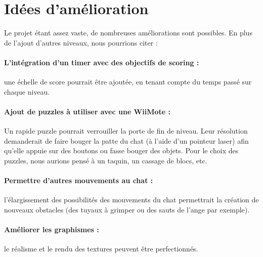 \documentclass[a4paper,11pt]{article}
\begin{document}
\section{Idées d'amélioration}
Le projet étant assez vaste, de nombreuses améliorations sont possibles. En plus de l'ajout d'autres niveaux, nous pourrions citer : 
\paragraph{L'intégration d'un timer avec des objectifs de scoring :} une échelle de score pourrait être ajoutée, en tenant compte du temps passé sur chaque niveau.
\paragraph{Ajout de puzzles à utiliser avec une WiiMote :} %
Un rapide puzzle pourrait verrouiller la porte de fin de niveau. Leur résolution demanderait de faire bouger la patte du chat (à l'aide d'un pointeur laser) afin qu'elle appuie sur des boutons ou fasse bouger des objets. Pour le choix des puzzles, nous aurions pensé à un taquin, un cassage de blocs, etc.
\paragraph{Permettre d'autres mouvements au chat :} l'élargissement des possibilités des mouvements du chat permettrait la création de nouveaux obstacles (des tuyaux à grimper ou des sauts de l'ange par exemple).
\paragraph{Améliorer les graphismes :} le réalisme et le rendu des textures peuvent être perfectionnés.
\\
\end{document}
